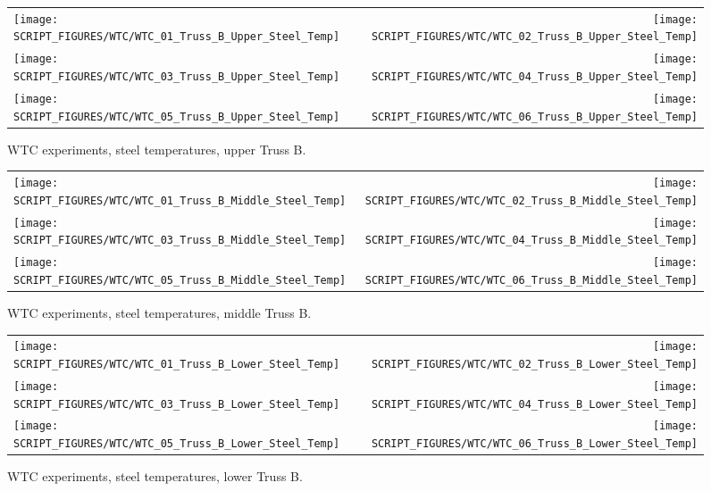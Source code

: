 \begin{figure}[p]
\begin{tabular*}{\textwidth}{l@{\extracolsep{\fill}}r}
\texttt{[image: SCRIPT\_FIGURES/WTC/WTC\_01\_Truss\_B\_Upper\_Steel\_Temp]} &
\texttt{[image: SCRIPT\_FIGURES/WTC/WTC\_02\_Truss\_B\_Upper\_Steel\_Temp]} \\
\texttt{[image: SCRIPT\_FIGURES/WTC/WTC\_03\_Truss\_B\_Upper\_Steel\_Temp]} &
\texttt{[image: SCRIPT\_FIGURES/WTC/WTC\_04\_Truss\_B\_Upper\_Steel\_Temp]} \\
\texttt{[image: SCRIPT\_FIGURES/WTC/WTC\_05\_Truss\_B\_Upper\_Steel\_Temp]} &
\texttt{[image: SCRIPT\_FIGURES/WTC/WTC\_06\_Truss\_B\_Upper\_Steel\_Temp]}
\end{tabular*}
\caption{WTC experiments, steel temperatures, upper Truss B.}
\label{NIST_WTC_Truss_B_Upper_Steel_Temp}
\end{figure}

\begin{figure}[p]
\begin{tabular*}{\textwidth}{l@{\extracolsep{\fill}}r}
\texttt{[image: SCRIPT\_FIGURES/WTC/WTC\_01\_Truss\_B\_Middle\_Steel\_Temp]} &
\texttt{[image: SCRIPT\_FIGURES/WTC/WTC\_02\_Truss\_B\_Middle\_Steel\_Temp]} \\
\texttt{[image: SCRIPT\_FIGURES/WTC/WTC\_03\_Truss\_B\_Middle\_Steel\_Temp]} &
\texttt{[image: SCRIPT\_FIGURES/WTC/WTC\_04\_Truss\_B\_Middle\_Steel\_Temp]} \\
\texttt{[image: SCRIPT\_FIGURES/WTC/WTC\_05\_Truss\_B\_Middle\_Steel\_Temp]} &
\texttt{[image: SCRIPT\_FIGURES/WTC/WTC\_06\_Truss\_B\_Middle\_Steel\_Temp]}
\end{tabular*}
\caption{WTC experiments, steel temperatures, middle Truss B.}
\label{NIST_WTC_Truss_B_Middle_Steel_Temp}
\end{figure}

\begin{figure}[p]
\begin{tabular*}{\textwidth}{l@{\extracolsep{\fill}}r}
\texttt{[image: SCRIPT\_FIGURES/WTC/WTC\_01\_Truss\_B\_Lower\_Steel\_Temp]} &
\texttt{[image: SCRIPT\_FIGURES/WTC/WTC\_02\_Truss\_B\_Lower\_Steel\_Temp]} \\
\texttt{[image: SCRIPT\_FIGURES/WTC/WTC\_03\_Truss\_B\_Lower\_Steel\_Temp]} &
\texttt{[image: SCRIPT\_FIGURES/WTC/WTC\_04\_Truss\_B\_Lower\_Steel\_Temp]} \\
\texttt{[image: SCRIPT\_FIGURES/WTC/WTC\_05\_Truss\_B\_Lower\_Steel\_Temp]} &
\texttt{[image: SCRIPT\_FIGURES/WTC/WTC\_06\_Truss\_B\_Lower\_Steel\_Temp]}
\end{tabular*}
\caption{WTC experiments, steel temperatures, lower Truss B.}
\label{NIST_WTC_Truss_B_Lower_Steel_Temp}
\end{figure}


